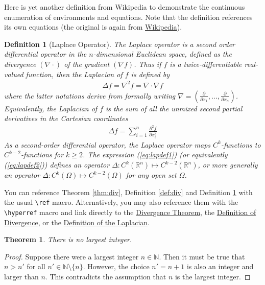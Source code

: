 \documentclass[10pt]{article}
\newtheorem{theorem}{Theorem}
\newtheorem{definition}{Definition}
\begin{document}
Here is yet another definition from Wikipedia to demonstrate the continuous
enumeration of environments and equations. Note that the definition references
its own equations (the original is again from
\href{http://en.wikipedia.org/wiki/Laplace_operator}{Wikipedia}).
\begin{definition}[Laplace Operator]
  \label{def:lap}
  The Laplace operator is a second order differential operator in the
  $n$-dimensional Euclidean space, defined as the divergence
  $(\nabla\cdot)$ of the gradient $(\nabla f)$. Thus if $f$ is a
  twice-differentiable real-valued function, then the Laplacian of $f$
  is defined by
  \begin{align}
    \label{eq:lapdef1}
    \Delta f = \nabla^2f = \nabla\cdot\nabla f
  \end{align}
  where the latter notations derive from formally writing $\nabla =
  \left(\frac{\partial}{\partial x_1}, \ldots,
    \frac{\partial}{\partial x_n}\right)$. Equivalently, the Laplacian
  of $f$ is the sum of all the unmixed second partial derivatives in the
  Cartesian coordinates
  \begin{align}
    \label{eq:lapdef2}
    \Delta f = \sum_{i=1}^n \frac{\partial^2f}{\partial x_i^2}
  \end{align}
  As a second-order differential operator, the Laplace operator maps
  $C^k$-functions to $C^{k-2}$-functions for $k\geq 2$. The expression
  (\ref{eq:lapdef1}) (or equivalently (\ref{eq:lapdef2})) defines an
  operator $\Delta : C^k(\mathbb{R}^n) \mapsto
  C^{k-2}(\mathbb{R}^n)$, or more generally an operator $\Delta :
  C^k(\Omega) \mapsto C^{k-2}(\Omega)$ for any open set $\Omega$.
\end{definition}

You can reference Theorem \ref{thm:div}, Definition
\ref{def:div} and Definition \ref{def:lap} with the usual
\texttt{\textbackslash{ref}} macro. Alternatively,
you may also reference them with the \texttt{\textbackslash{hyperref}}
macro and link directly to the \hyperref[thm:div]{Divergence Theorem},
the \hyperref[def:div]{Definition of Divergence}, or the
\hyperref[def:div]{Definition of the Laplacian}.

\begin{theorem}
  \label{thm:no_largest_int}
  There is no largest integer.
\end{theorem}
\begin{proof}
  Suppose there were a largest integer $n\in\mathbb{N}$. Then it must
  be true that $n > n'$ for all $n'\in\mathbb{N}\setminus\{n\}$. However,
  the choice $n' = n + 1$ is also an integer and larger than $n$. This
  contradicts the assumption that $n$ is the largest integer.
\end{proof}
\end{document}
